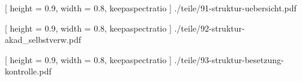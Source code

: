\documentclass[
	10pt,
	a5paper,
	twoside
	]
	{book}
\begin{document}
\clearpage



	[
		height = 0.9\paperheight,
		width = 0.8\paperwidth,
		keepaspectratio
	]
	{./teile/91-struktur-uebersicht.pdf}




	[
		height = 0.9\paperheight,
		width = 0.8\paperwidth,
		keepaspectratio
	]
	{./teile/92-struktur-akad_selbstverw.pdf}




	[
		height = 0.9\paperheight,
		width = 0.8\paperwidth,
		keepaspectratio
	]
	{./teile/93-struktur-besetzung-kontrolle.pdf}



\backmatter


\end{document}
